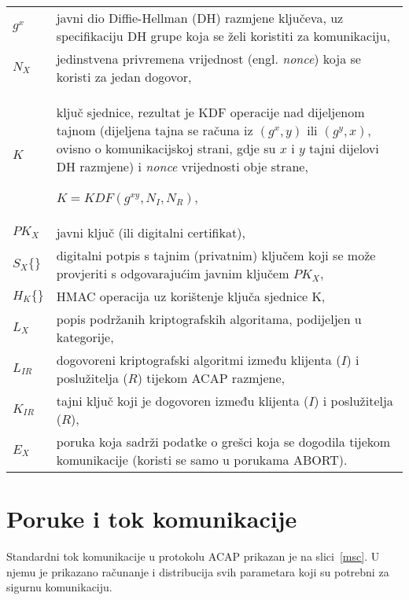 {
\renewcommand{\arraystretch}{1.40}
\begin{tabular}{p{1.0cm} p{13.5cm}}
$g^x	$ & javni dio Diffie-Hellman (DH) razmjene ključeva, uz specifikaciju DH
	    grupe koja se želi koristiti za komunikaciju, \\

$N_X	$ & jedinstvena privremena vrijednost (engl. \emph{nonce}) koja se koristi za
	    jedan dogovor, \\

$K	$ & ključ sjednice, rezultat je KDF operacije nad dijeljenom
	    tajnom (dijeljena tajna se računa iz $(g^x, y)$ ili $(g^y, x)$,
	    ovisno o komunikacijskoj strani, gdje su $x$ i $y$ tajni dijelovi
	    DH razmjene) i \emph{nonce} vrijednosti obje strane,

	    $K = KDF (g^{xy},N_I,N_R) $, \\

$PK_X	$ & javni ključ (ili digitalni certifikat), \\

$S_X\{\}$ & digitalni potpis s tajnim (privatnim) ključem koji se može
	    provjeriti s odgovarajućim javnim ključem $PK_X$,\\

$H_K\{\}$ & HMAC operacija uz korištenje ključa sjednice K, \\

$L_X	$ & popis podržanih kriptografskih algoritama, podijeljen u kategorije, \\

$L_{IR} $ & dogovoreni kriptografski algoritmi između klijenta ($I$) i poslužitelja ($R$)
	    tijekom ACAP razmjene, \\

$K_{IR} $ & tajni ključ koji je dogovoren između klijenta ($I$) i poslužitelja
	    ($R$), \\

$E_X	$ & poruka koja sadrži podatke o grešci koja se dogodila tijekom
	    komunikacije (koristi se samo u porukama ABORT). \\
\end{tabular}
}

\section{Poruke i tok komunikacije}
\label{sec:poruke}

Standardni tok komunikacije u protokolu ACAP prikazan je na
slici~\ref{msc}. U njemu je prikazano računanje i distribucija svih parametara
koji su potrebni za sigurnu komunikaciju.

